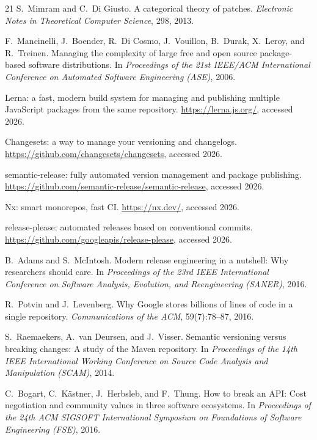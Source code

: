 \documentclass[10pt,conference]{IEEEtran}
\theoremstyle{definition}
\begin{document}
\begin{thebibliography}{21}
S.~Mimram and C.~Di Giusto.
A categorical theory of patches.
\emph{Electronic Notes in Theoretical Computer Science}, 298, 2013.

F.~Mancinelli, J.~Boender, R.~Di Cosmo, J.~Vouillon, B.~Durak,
X.~Leroy, and R.~Treinen.
Managing the complexity of large free and open source package-based
software distributions.
In \emph{Proceedings of the 21st IEEE/ACM International Conference on
Automated Software Engineering (ASE)}, 2006.

Lerna: a fast, modern build system for managing and publishing multiple
JavaScript packages from the same repository.
\url{https://lerna.js.org/}, accessed 2026.

Changesets: a way to manage your versioning and changelogs.
\url{https://github.com/changesets/changesets}, accessed 2026.

semantic-release: fully automated version management and package
publishing.
\url{https://github.com/semantic-release/semantic-release},
accessed 2026.

Nx: smart monorepos, fast CI.
\url{https://nx.dev/}, accessed 2026.

release-please: automated releases based on conventional commits.
\url{https://github.com/googleapis/release-please}, accessed 2026.

B.~Adams and S.~McIntosh.
Modern release engineering in a nutshell: Why researchers should care.
In \emph{Proceedings of the 23rd IEEE International Conference on
Software Analysis, Evolution, and Reengineering (SANER)}, 2016.

R.~Potvin and J.~Levenberg.
Why Google stores billions of lines of code in a single repository.
\emph{Communications of the ACM}, 59(7):78--87, 2016.

S.~Raemaekers, A.~van Deursen, and J.~Visser.
Semantic versioning versus breaking changes: A study of the Maven
repository.
In \emph{Proceedings of the 14th IEEE International Working Conference
on Source Code Analysis and Manipulation (SCAM)}, 2014.

C.~Bogart, C.~K\"astner, J.~Herbsleb, and F.~Thung.
How to break an API: Cost negotiation and community values in three
software ecosystems.
In \emph{Proceedings of the 24th ACM SIGSOFT International Symposium on
Foundations of Software Engineering (FSE)}, 2016.


\end{thebibliography}
\end{document}
